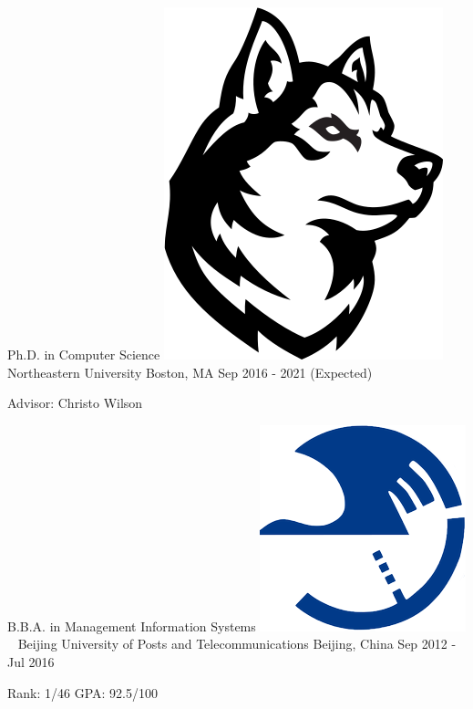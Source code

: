 \documentclass[letterpaper]{awesome-cv}
\begin{document}
\makecvheader

\addvspace{4ex}
\begin{cventries}
  \cventry
    {Ph.D. in Computer Science}
    {\includegraphics[height=0.02\textwidth]{../images/logos/northeastern.png}~ Northeastern University}
    {Boston, MA}
    {Sep 2016 - 2021 (Expected)}
    {
      \begin{cvitems}
        \item {Advisor: Christo Wilson}
      \end{cvitems}
    }
  \cventry
    {B.B.A. in Management Information Systems}
    {\includegraphics[height=0.017\textwidth]{../images/logos/bupt.png}~ Beijing University of Posts and Telecommunications}
    {Beijing, China}
    {Sep 2012 - Jul 2016}
    {
      \begin{cvitems}
        \item {Rank: 1/46 \hspace{0.5ex} GPA: 92.5/100}
      \end{cvitems}
    }
\end{cventries}

\end{document}
